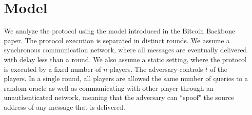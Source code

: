 \section{Model}

We analyze the protocol using the model introduced in the Bitcoin Backbone~\cite{backbone} paper.
The protocol execution is separated in distinct rounds.
We assume a synchronous communication network, where all messages are eventually
delivered with delay less than a round.
We also assume a static setting, where the protocol is executed by
a fixed number of $n$ players.
The adversary controls $t$ of the players.
In a single round, all players are allowed the same number of queries to
a random oracle as well as communicating with other player through an
unauthenticated network, meaning that the adversary can ``spoof"
the source address of any message that is delivered.
